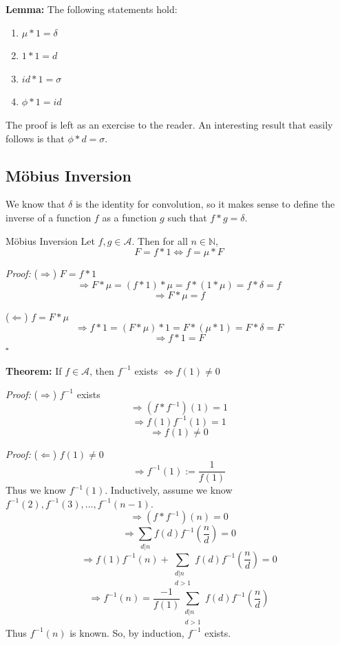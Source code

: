 \documentclass[a4paper,11pt,abstracton]{scrartcl}
\theoremstyle{dotlessP}
\theoremstyle{dotlessS}
\theoremstyle{remark}
\theoremstyle{definition}
\begin{document}
\begin{claim_box}
\textbf{Lemma:} The following statements hold: 
\begin{enumerate}
\item $\mu * 1 = \delta$
\item $1 * 1 = d$
\item $id * 1 = \sigma$
\item $\phi * 1 = id$
\end{enumerate}
The proof is left as an exercise to the reader. An interesting result that easily follows is that $\phi * d = \sigma$.
\end{claim_box}

\subsection{Möbius Inversion}

We know that $\delta$ is the identity for convolution, so it makes sense to define the inverse of a function $f$ as a function $g$ such that $f*g=\delta$.

\begin{mainbox}{Möbius Inversion}
Let $f,g \in \mathcal{A}$. Then for all $n \in \mathbb{N}$,
$$F = f*1 \iff f = \mu * F$$ 
\end{mainbox}

\begin{claim_box}
\textit{Proof:} ($\Rightarrow$) 
$F = f * 1$
$$\Rightarrow F * \mu = (f * 1) * \mu = f * (1 * \mu) = f * \delta = f$$
$$\Rightarrow F * \mu = f$$
\end{claim_box}
\begin{claim_box}
($\Leftarrow$) 
$f = F * \mu$
$$\Rightarrow f * 1 = (F * \mu) * 1 = F * (\mu * 1) = F * \delta = F$$
$$\Rightarrow f * 1 = F$$
\hfill$\square$
\end{claim_box}

\textbf{Theorem:} 
If $f \in \mathcal{A}$, then $f^{-1}$ exists $\iff f(1) \neq 0$

\begin{claim_box}
\textit{Proof:} ($\Rightarrow$)
$f^{-1}$ exists 
$$\Rightarrow(f * f^{-1})(1) = 1$$
$$\Rightarrow f(1)f^{-1}(1)=1$$
$$\Rightarrow f(1) \neq 0$$
\end{claim_box}

\begin{claim_box}
\textit{Proof:} ($\Leftarrow$)
$f(1) \neq 0$
$$\Rightarrow f^{-1}(1) := \frac{1}{f(1)}$$
Thus we know $f^{-1}(1)$. Inductively, assume we know $f^{-1}(2), f^{-1}(3), \dots, f^{-1}(n-1)$.
$$\Rightarrow(f * f^{-1})(n) = 0$$
$$\Rightarrow \sum_{d|n} f(d)f^{-1}(\frac{n}{d}) = 0$$
$$\Rightarrow f(1)f^{-1}(n) + \sum_{\substack{d|n \\ d>1}} f(d)f^{-1}(\frac{n}{d}) = 0$$
$$\Rightarrow f^{-1}(n) = \frac{-1}{f(1)}\sum_{\substack{d|n \\ d>1}} f(d)f^{-1}(\frac{n}{d})$$
Thus $f^{-1}(n)$ is known. So, by induction, $f^{-1}$ exists.
\end{claim_box}
\end{document}
